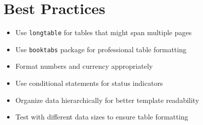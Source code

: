 \documentclass{article}
\begin{document}
\section{Best Practices}

\begin{itemize}
\item Use \texttt{longtable} for tables that might span multiple pages
\item Use \texttt{booktabs} package for professional table formatting
\item Format numbers and currency appropriately
\item Use conditional statements for status indicators
\item Organize data hierarchically for better template readability
\item Test with different data sizes to ensure table formatting
\end{itemize}
\end{document}
